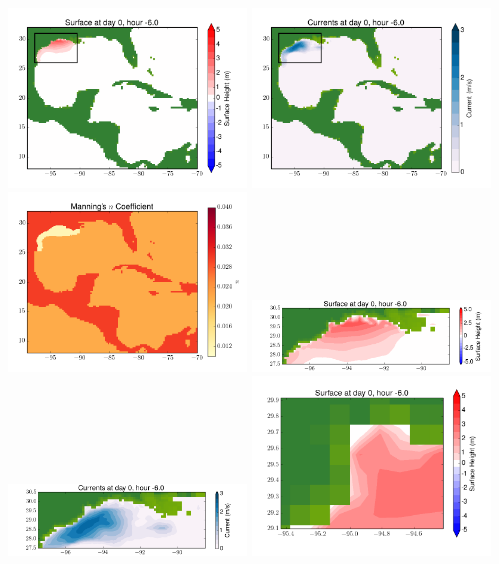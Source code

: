 \documentclass[11pt]{article}
\begin{document}
\vskip 10pt 
\includegraphics[width=0.475\textwidth]{frame0066fig1.png}
\includegraphics[width=0.475\textwidth]{frame0066fig2.png}
\vskip 10pt 
\includegraphics[width=0.475\textwidth]{frame0066fig3.png}
\includegraphics[width=0.475\textwidth]{frame0066fig4.png}
\vskip 10pt 
\includegraphics[width=0.475\textwidth]{frame0066fig5.png}
\includegraphics[width=0.475\textwidth]{frame0066fig6.png}
\end{document}
